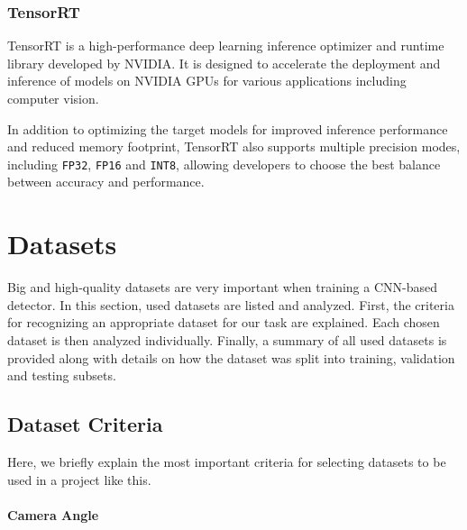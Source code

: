 \subsection{TensorRT}

TensorRT  is a high-performance deep learning inference optimizer and runtime
library developed by NVIDIA. It is designed to accelerate the deployment and
inference of models on NVIDIA GPUs for various applications including computer
vision.

In addition to optimizing the target models for improved inference
performance and reduced memory footprint, TensorRT also supports multiple
precision modes, including \texttt{FP32}, \texttt{FP16} and \texttt{INT8},
allowing developers to choose the best balance between accuracy and performance.






\chapter{Datasets}

Big and high-quality datasets are very important when training a CNN-based
detector. In this section, used datasets are listed and analyzed. First, the
criteria for recognizing an appropriate dataset for our task are explained. Each
chosen dataset is then analyzed individually. Finally, a summary of all used
datasets is provided along with details on how the dataset was split into
training, validation and testing subsets.


\section{Dataset Criteria}


Here, we briefly explain the most important criteria for selecting datasets to
be used in a project like this.

\subsubsection*{Camera Angle}

